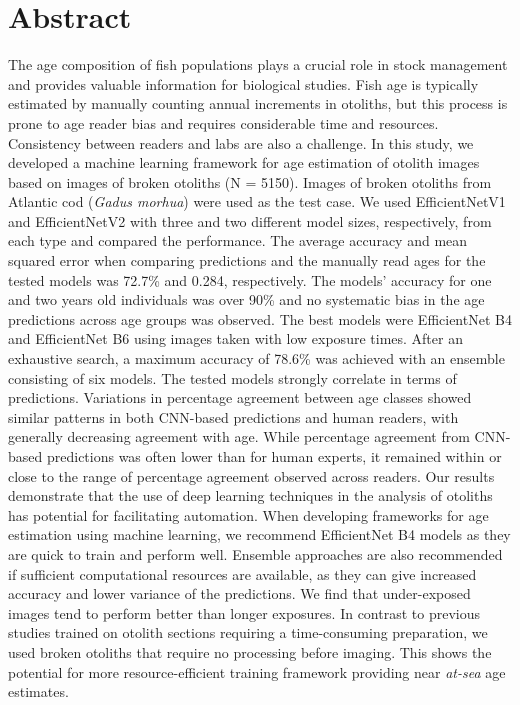 \documentclass[10pt,letterpaper]{article}
\begin{document}
\section*{Abstract}
The age composition of fish populations plays a crucial role in stock management and provides valuable information for biological studies. Fish age is typically estimated by manually counting annual increments in otoliths, but  this process is prone to age reader bias and requires considerable time and resources. Consistency between readers and labs are also a challenge. In this study, we developed a machine learning framework for age estimation of otolith images based on images of broken otoliths (N = 5150). Images of broken otoliths from Atlantic cod (\textit{Gadus morhua}) were used as the test case. We used EfficientNetV1 and EfficientNetV2 with three and two different model sizes, respectively, from each type and compared the performance. The average accuracy and mean squared error when comparing predictions and the manually read ages  for the tested models was 72.7\% and 0.284, respectively. The models’ accuracy for one and two years old individuals was over 90\% and no systematic bias in the age predictions across age groups was observed. The  best models were EfficientNet B4 and EfficientNet B6 using  images taken with low exposure times. After an exhaustive search, a maximum accuracy of 78.6\% was achieved with an ensemble consisting of six models. The tested models strongly correlate in terms of predictions. Variations in percentage agreement between age classes showed similar patterns in both CNN-based predictions and human readers, with generally decreasing agreement with age. While percentage agreement from CNN-based predictions was often lower than for human experts, it remained within or close to the range of percentage agreement observed across readers. Our results demonstrate that the use of deep learning techniques in the analysis of otoliths has potential for facilitating automation. When developing frameworks for age estimation using machine learning, we recommend EfficientNet B4 models as they are quick to train and perform well. Ensemble approaches are also recommended if sufficient computational resources are available, as they can give increased accuracy and lower variance of the predictions. We find that under-exposed images tend to perform better than longer exposures. In contrast to previous studies trained on otolith sections requiring a time-consuming preparation, we used broken otoliths that require no processing before imaging. This shows the potential for more resource-efficient training framework providing near \textit{at-sea} age estimates.
\end{document}
